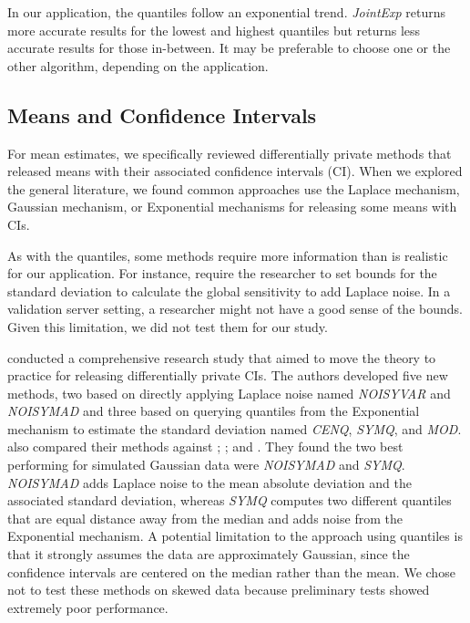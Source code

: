 In our application, the quantiles follow an exponential trend. \textit{JointExp} returns more accurate results for the lowest and highest quantiles but returns less accurate results for those in-between. It may be preferable to choose one or the other algorithm, depending on the application.

\subsection{Means and Confidence Intervals}
For mean estimates, we specifically reviewed differentially private methods that released means with their associated confidence intervals (CI). When we explored the general literature, we found common approaches use the Laplace mechanism, Gaussian mechanism, or Exponential mechanisms for releasing some means with CIs.

As with the quantiles, some methods require more information than is realistic for our application. For instance, \citet{karwa2017finite, bowen2020comparative, d2015differential, biswas2020coinpress} require the researcher to set bounds for the standard deviation to calculate the global sensitivity to add Laplace noise. In a validation server setting, a researcher might not have a good sense of the bounds. Given this limitation, we did not test them for our study.

\citet{du2020differentially} conducted a comprehensive research study that aimed to move the theory to practice for releasing differentially private CIs. The authors developed five new methods, two based on directly applying Laplace noise named \textit{NOISYVAR} and \textit{NOISYMAD} and three based on querying quantiles from the Exponential mechanism  to estimate the standard deviation named \textit{CENQ}, \textit{SYMQ}, and \textit{MOD}. \citet{du2020differentially} also compared their methods against \citet{karwa2017finite}; \citet{d2015differential}; and \citet{brawner2018bootstrap}. They found the two best performing for simulated Gaussian data were \textit{NOISYMAD} and \textit{SYMQ}. \textit{NOISYMAD} adds Laplace noise to the mean absolute deviation and the associated standard deviation, whereas \textit{SYMQ} computes two different quantiles that are equal distance away from the median and adds noise from the Exponential mechanism. A potential limitation to the approach using quantiles is that it strongly assumes the data are approximately Gaussian, since the confidence intervals are centered on the median rather than the mean. We chose not to test these methods on skewed data because preliminary tests showed extremely poor performance.

